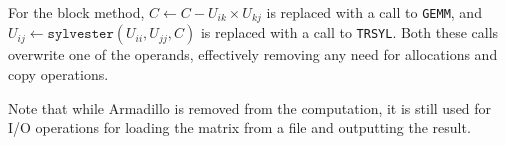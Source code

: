 \documentclass[../thesis]{subfiles}
\begin{document}
	For the block method, $C \leftarrow C - U_{ik} \times U_{kj}$ is replaced with a call to \blas\texttt{GEMM}, and $U_{ij} \leftarrow \mathtt{sylvester} \left( U_{ii}, U_{jj}, C\right)$ is replaced with a call to \lapack\texttt{TRSYL}. Both these calls overwrite one of the operands, effectively removing any need for allocations and copy operations.

	Note that while Armadillo is removed from the computation, it is still used for I/O operations for loading the matrix from a file and outputting the result.

	
	
\end{document}
